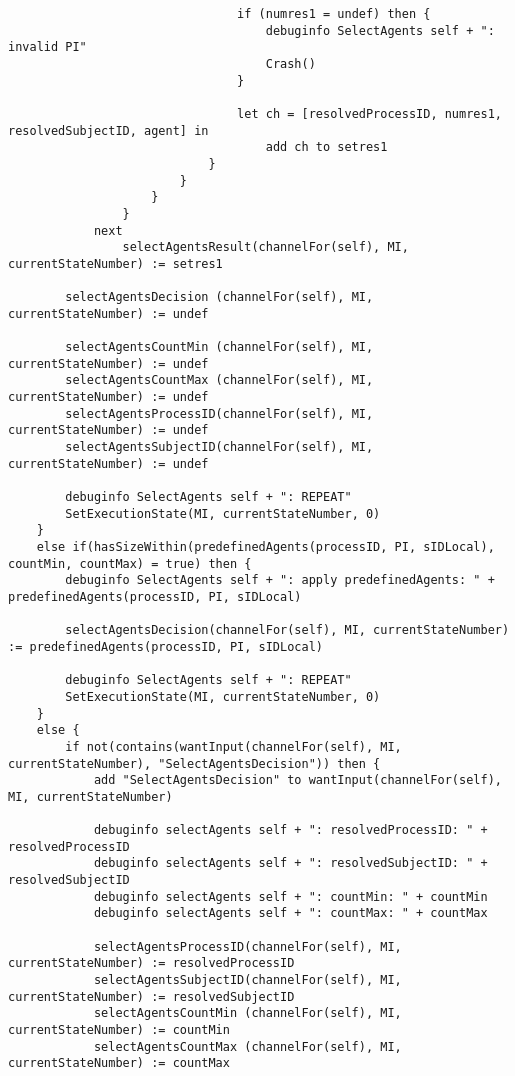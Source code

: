 \begin{listing}[H]
\begin{verbatim}
                                if (numres1 = undef) then {
                                    debuginfo SelectAgents self + ": invalid PI"
                                    Crash()
                                }

                                let ch = [resolvedProcessID, numres1, resolvedSubjectID, agent] in
                                    add ch to setres1
                            }
                        }
                    }
                }
            next
                selectAgentsResult(channelFor(self), MI, currentStateNumber) := setres1

        selectAgentsDecision (channelFor(self), MI, currentStateNumber) := undef

        selectAgentsCountMin (channelFor(self), MI, currentStateNumber) := undef
        selectAgentsCountMax (channelFor(self), MI, currentStateNumber) := undef
        selectAgentsProcessID(channelFor(self), MI, currentStateNumber) := undef
        selectAgentsSubjectID(channelFor(self), MI, currentStateNumber) := undef

        debuginfo SelectAgents self + ": REPEAT"
        SetExecutionState(MI, currentStateNumber, 0)
    }
    else if(hasSizeWithin(predefinedAgents(processID, PI, sIDLocal), countMin, countMax) = true) then {
        debuginfo SelectAgents self + ": apply predefinedAgents: " + predefinedAgents(processID, PI, sIDLocal)

        selectAgentsDecision(channelFor(self), MI, currentStateNumber) := predefinedAgents(processID, PI, sIDLocal)

        debuginfo SelectAgents self + ": REPEAT"
        SetExecutionState(MI, currentStateNumber, 0)
    }
    else {
        if not(contains(wantInput(channelFor(self), MI, currentStateNumber), "SelectAgentsDecision")) then {
            add "SelectAgentsDecision" to wantInput(channelFor(self), MI, currentStateNumber)

            debuginfo selectAgents self + ": resolvedProcessID: " + resolvedProcessID
            debuginfo selectAgents self + ": resolvedSubjectID: " + resolvedSubjectID
            debuginfo selectAgents self + ": countMin: " + countMin
            debuginfo selectAgents self + ": countMax: " + countMax

            selectAgentsProcessID(channelFor(self), MI, currentStateNumber) := resolvedProcessID
            selectAgentsSubjectID(channelFor(self), MI, currentStateNumber) := resolvedSubjectID
            selectAgentsCountMin (channelFor(self), MI, currentStateNumber) := countMin
            selectAgentsCountMax (channelFor(self), MI, currentStateNumber) := countMax


\end{verbatim}
\end{listing}
